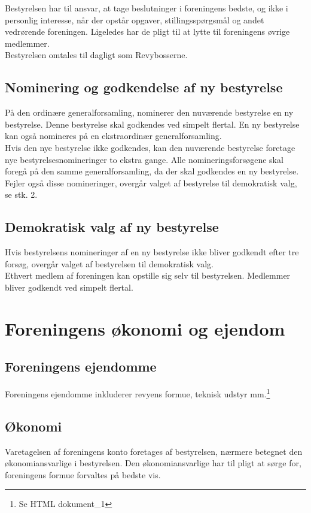\documentclass[a4paper,11pt,danish]{article}
\begin{document}
\noindent Bestyrelsen har til ansvar, at tage beslutninger i foreningens bedste,
og ikke i personlig interesse, når der opstår opgaver, stillingsspørgsmål og
andet vedrørende foreningen. Ligeledes har de pligt til at lytte til foreningens
øvrige medlemmer.\\

\noindent Bestyrelsen omtales til dagligt som Revybosserne.

\subsection{Nominering og godkendelse af ny bestyrelse}
På den ordinære generalforsamling, nominerer den nuværende bestyrelse en ny
bestyrelse.  Denne bestyrelse skal godkendes ved simpelt flertal.  En ny
bestyrelse kan også nomineres på en ekstraordinær generalforsamling.\\

\noindent Hvis den nye bestyrelse ikke godkendes, kan den nuværende bestyrelse
foretage nye bestyrelsesnomineringer to ekstra gange.  Alle nomineringsforsøgene
skal foregå på den samme generalforsamling, da der skal godkendes en ny
bestyrelse. Fejler også disse nomineringer, overgår valget af bestyrelse til
demokratisk valg, se stk. 2.

\subsection{Demokratisk valg af ny bestyrelse}
Hvis bestyrelsens nomineringer af en ny bestyrelse ikke bliver godkendt efter
tre forsøg, overgår valget af bestyrelsen til demokratisk valg.\\

\noindent Ethvert medlem af foreningen kan opstille sig selv til bestyrelsen.
Medlemmer bliver godkendt ved simpelt flertal.

\section{Foreningens økonomi og ejendom}
\subsection{Foreningens ejendomme}
Foreningens ejendomme inkluderer revyens formue, teknisk udstyr
mm.\footnote{Se HTML dokument\_1}

\subsection{Økonomi}
Varetagelsen af foreningens konto foretages af bestyrelsen, nærmere betegnet den
økonomiansvarlige i bestyrelsen. Den økonomiansvarlige har til pligt at sørge
for, foreningens formue forvaltes på bedste vis.\\
\end{document}
